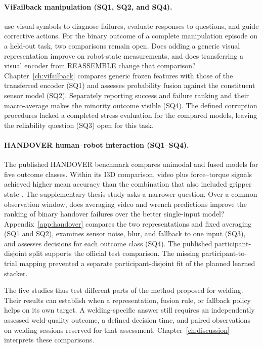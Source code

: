 \paragraph{ViFailback manipulation (SQ1, SQ2, and SQ4).}
\citet[PDF pp.~7--8, Tables~2--4]{Zeng2026ViFailback} use visual symbols to diagnose failures, evaluate responses to questions, and guide corrective actions. For the binary outcome of a complete manipulation episode on a held-out task, two comparisons remain open. Does adding a generic visual representation improve on robot-state measurements, and does transferring a visual encoder from REASSEMBLE change that comparison? Chapter~\ref{ch:vifailback} compares generic frozen features with those of the transferred encoder (SQ1) and assesses probability fusion against the constituent sensor model (SQ2). Separately reporting success and failure ranking and their macro-average makes the minority outcome visible (SQ4). The defined corruption procedures lacked a completed stress evaluation for the compared models, leaving the reliability question (SQ3) open for this task.

\paragraph{HANDOVER human--robot interaction (SQ1--SQ4).}
The published HANDOVER benchmark compares unimodal and fused models for five outcome classes. Within its I3D comparison, video plus force--torque signals achieved higher mean accuracy than the combination that also included gripper state \citep[PDF p.~7, Table~III]{Thoduka2024Handover}. The supplementary thesis study asks a narrower question. Over a common observation window, does averaging video and wrench predictions improve the ranking of binary handover failures over the better single-input model? Appendix~\ref{app:handover} compares the two representations and fixed averaging (SQ1 and SQ2), examines sensor noise, blur, and fallback to one input (SQ3), and assesses decisions for each outcome class (SQ4). The published participant-disjoint split supports the official test comparison. The missing participant-to-trial mapping prevented a separate participant-disjoint fit of the planned learned stacker.

\medskip
\noindent The five studies thus test different parts of the method proposed for welding. Their results can establish when a representation, fusion rule, or fallback policy helps on its own target. A welding-specific answer still requires an independently assessed weld-quality outcome, a defined decision time, and paired observations on welding sessions reserved for that assessment. Chapter~\ref{ch:discussion} interprets these comparisons.
